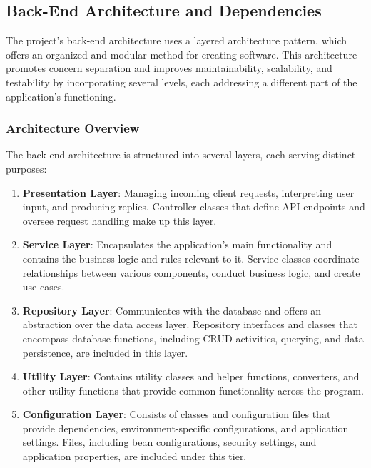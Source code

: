 \documentclass[conference]{IEEEtran}
\begin{document}
\subsection{Back-End Architecture and Dependencies}

The project's back-end architecture uses a layered architecture pattern, which offers an organized and modular method for creating software. This architecture promotes concern separation and improves maintainability, scalability, and testability by incorporating several levels, each addressing a different part of the application's functioning.

\subsubsection{Architecture Overview}

The back-end architecture is structured into several layers, each serving distinct purposes:

\begin{enumerate}
    \item \textbf{Presentation Layer}: Managing incoming client requests, interpreting user input, and producing replies. Controller classes that define API endpoints and oversee request handling make up this layer.
    
    \item \textbf{Service Layer}: Encapsulates the application's main functionality and contains the business logic and rules relevant to it. Service classes coordinate relationships between various components, conduct business logic, and create use cases.
    
    \item \textbf{Repository Layer}: Communicates with the database and offers an abstraction over the data access layer. Repository interfaces and classes that encompass database functions, including CRUD activities, querying, and data persistence, are included in this layer.
    
    \item \textbf{Utility Layer}: Contains utility classes and helper functions, converters, and other utility functions that provide common functionality across the program.
        
    \item \textbf{Configuration Layer}: Consists of classes and configuration files that provide dependencies, environment-specific configurations, and application settings. Files, including bean configurations, security settings, and application properties, are included under this tier.
\end{enumerate}
\end{document}

